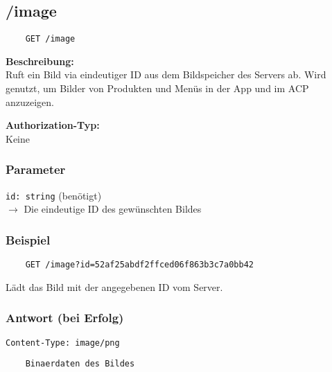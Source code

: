\subsection{/image}

\begin{lstlisting}
    GET /image
\end{lstlisting}

\textbf{Beschreibung:} \\
Ruft ein Bild via eindeutiger ID aus dem Bildspeicher des Servers ab. Wird genutzt, um Bilder von Produkten und Menüs in der App und im ACP anzuzeigen.

\textbf{Authorization-Typ:} \\
Keine

\subsubsection{Parameter}

\lstinline{id: string} (benötigt) \\
$\rightarrow$ Die eindeutige ID des gewünschten Bildes

\subsubsection{Beispiel}

\begin{lstlisting}
    GET /image?id=52af25abdf2ffced06f863b3c7a0bb42
\end{lstlisting}

Lädt das Bild mit der angegebenen ID vom Server.

\subsubsection{Antwort (bei Erfolg)}

\lstinline{Content-Type: image/png}
\begin{lstlisting}
    Binaerdaten des Bildes
\end{lstlisting}